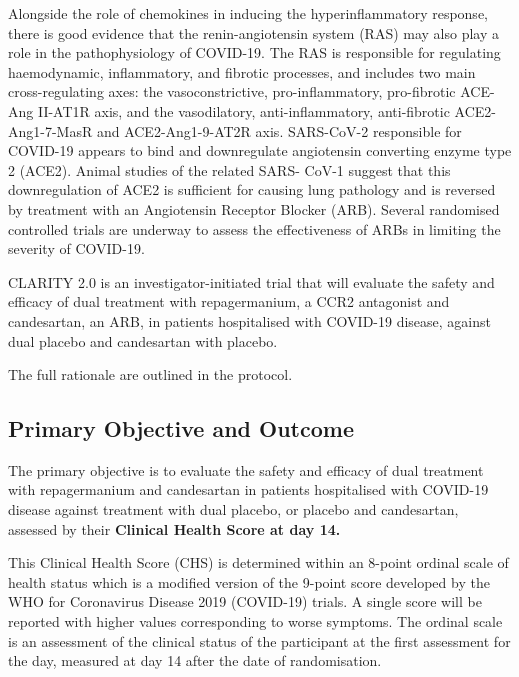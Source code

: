 \documentclass[11pt,parskip=half-]{scrartcl}
\begin{document}
Alongside the role of chemokines in inducing the hyperinflammatory response, there is good evidence that the renin-angiotensin system (RAS) may also play a role in the pathophysiology of COVID-19. The RAS is responsible for regulating haemodynamic, inflammatory, and fibrotic processes, and includes two main cross-regulating axes: the vasoconstrictive, pro-inflammatory, pro-fibrotic ACE-Ang II-AT1R axis, and the vasodilatory, anti-inflammatory, anti-fibrotic ACE2-Ang1-7-MasR and ACE2-Ang1-9-AT2R axis. SARS-CoV-2 responsible for COVID-19 appears to bind and downregulate angiotensin converting enzyme type 2 (ACE2). Animal studies of the related SARS- CoV-1 suggest that this downregulation of ACE2 is sufficient for causing lung pathology and is reversed by treatment with an Angiotensin Receptor Blocker (ARB). Several randomised controlled trials are underway to assess the effectiveness of ARBs in limiting the severity of COVID-19.

CLARITY 2.0 is an investigator-initiated trial that will evaluate the safety and efficacy of dual treatment with repagermanium, a CCR2 antagonist and candesartan, an ARB, in patients hospitalised with COVID-19 disease, against dual placebo and candesartan with placebo.


The full rationale are outlined in the protocol. 


\subsection{Primary Objective and Outcome}
The primary objective is to evaluate the safety and efficacy of dual treatment with repagermanium and candesartan in patients hospitalised with COVID-19 disease against treatment with dual placebo, or placebo and candesartan, assessed by their \textbf{Clinical Health Score at day 14.}

This Clinical Health Score (CHS) is determined within an 8-point ordinal scale of health status which is a modified version of the 9-point score developed by the WHO for Coronavirus Disease 2019 (COVID-19) trials. A single score will be reported with higher values corresponding to worse symptoms. The ordinal scale is an assessment of the clinical status of the participant at the first assessment for the day, measured at day 14 after the date of randomisation.
\end{document}
